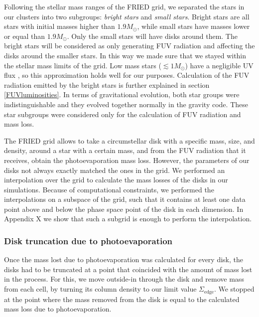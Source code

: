 \documentclass[fleqn,usenatbib]{mnras}
\newcommand\note[1]{{\colorbox{yellow!60}{\color{magenta}#1}}}
\begin{document}
Following the stellar mass ranges of the FRIED grid, we separated the stars in our clusters into two subgroups: \textit{bright stars} and \textit{small stars}. Bright stars are all stars with initial masses higher than $1.9 M_{\odot}$, while small stars have masses lower or equal than $1.9 M_{\odot}$. Only the small stars will have disks around them. The bright stars will be considered as only generating FUV radiation and affecting the disks around the smaller stars. In this way we made sure that we stayed within the stellar mass limits of the grid. Low mass stars ($\lesssim 1 M_\odot$) have a negligible UV flux \citep{adams2006}, so this approximation holds well for our purposes. Calculation of the FUV radiation emitted by the bright stars is further explained in section \ref{FUVluminosities}. In terms of gravitational evolution, both star groups were indistinguishable and they evolved together normally in the gravity code. These star subgroups were considered only for the calculation of FUV radiation and mass loss.

The FRIED grid allows to take a circumstellar disk with a specific mass, size, and density, around a star with a certain mass, and from the FUV radiation that it receives, obtain the photoevaporation mass loss. However, the parameters of our disks not always exactly matched the ones in the grid. We performed an interpolation over the grid to calculate the mass losses of the disks in our simulations. Because of computational constraints, we performed the interpolations on a subspace of the grid, such that it contains at least one data point above and below the phase space point of the disk in each dimension. In \note{Appendix X} we show that such a subgrid is enough to perform the interpolation.

\subsubsection{Disk truncation due to photoevaporation}\label{omnomnom}
Once the mass lost due to photoevaporation was calculated for every disk, the disks had to be truncated at a point that coincided with the amount of mass lost in the process. For this, we move outside-in through the disk and remove mass from each cell, by turning its column density to our limit value $\Sigma_{\mathrm{edge}}$. We stopped at the point where the mass removed from the disk is equal to the calculated mass loss due to photoevaporation.
\end{document}

